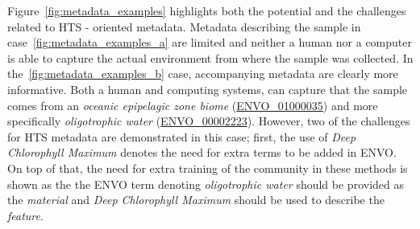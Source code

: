       Figure~\ref{fig:metadata_examples} highlights both the potential and the 
      challenges related to HTS - oriented metadata. 
      Metadata describing the sample in case~\ref{fig:metadata_examples_a}
      are limited and neither a human nor a computer is able to 
      capture the actual environment from where the sample was collected. 
      In the~\ref{fig:metadata_examples_b} case, accompanying metadata are clearly
      more informative.
      Both a human and computing systems, can capture that the sample comes from 
      an \textit{oceanic epipelagic zone biome} (\href{http://purl.obolibrary.org/obo/ENVO_01000035}{ENVO\_01000035})
      and more specifically
      \textit{oligotrophic water} (\href{http://purl.obolibrary.org/obo/ENVO_00002223}{ENVO\_00002223}).
      However, two of the challenges for HTS metadata are demonstrated in this case;
      first, the use of \textit{Deep Chlorophyll Maximum} 
      denotes the need for extra terms to be added in ENVO.  
      On top of that, the need for extra training of the community in these methods
      is shown as the the ENVO term denoting \textit{oligotrophic water} 
      should be provided as the \textit{material} 
      and \textit{Deep Chlorophyll Maximum} should be used to 
      describe the \textit{feature}.


      
